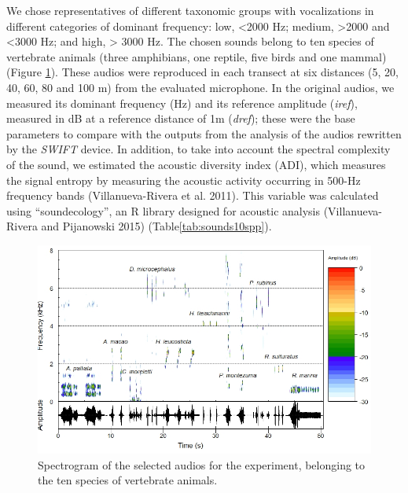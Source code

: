 \documentclass[fleqn,10pt,lineno]{wlpeerj} %
\begin{document}
We chose representatives of different taxonomic groups with vocalizations in different categories of dominant frequency: low, \textless2000 Hz; medium, \textgreater2000 and \textless3000 Hz; and high, \textgreater{} 3000 Hz. The chosen sounds belong to ten species of vertebrate animals (three amphibians, one reptile, five birds and one mammal) (Figure \ref{fig:spectrogram}). These audios were reproduced in each transect at six distances (5, 20, 40, 60, 80 and 100 m) from the evaluated microphone. In the original audios, we measured its dominant frequency (Hz) and its reference amplitude (\emph{iref}), measured in dB at a reference distance of 1m (\emph{dref}); these were the base parameters to compare with the outputs from the analysis of the audios rewritten by the \emph{SWIFT} device. In addition, to take into account the spectral complexity of the sound, we estimated the acoustic diversity index (ADI), which measures the signal entropy by measuring the acoustic activity occurring in 500-Hz frequency bands (Villanueva-Rivera et al. 2011). This variable was calculated using ``soundecology'', an R library designed for acoustic analysis (Villanueva-Rivera and Pijanowski 2015) (Table\ref{tab:sounds10spp}).

\begin{figure}

{\centering \includegraphics[width=1\linewidth]{espectrog} 

}

\caption{Spectrogram of the selected audios for the experiment, belonging to the ten species of vertebrate animals.\label{fig:spectrogram}}\label{fig:spectrogram}
\end{figure}
\end{document}
